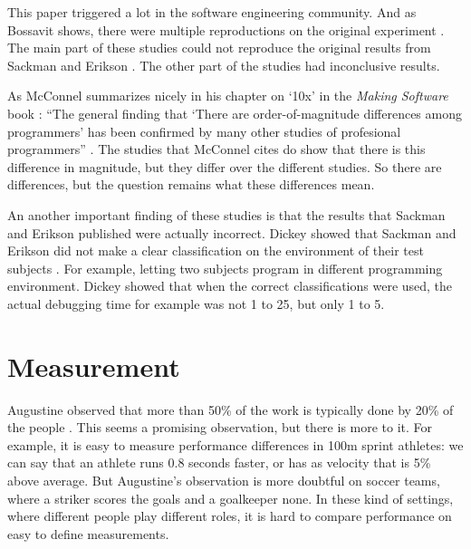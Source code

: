 This paper triggered a lot in the software engineering community.
And as Bossavit shows, there were multiple reproductions on the original experiment \autocite[38,41]{bossavit2013leprechauns}.
The main part of these studies could not reproduce the original results from Sackman and Erikson \autocite[42-44]{bossavit2013leprechauns}.
The other part of the studies had inconclusive results.

As McConnel summarizes nicely in his chapter on `10x' in the \textit{Making Software} book \autocite{MAKING_SOFTWARE}:
``The general finding that `There are order-of-magnitude differences among programmers' has been confirmed by many other studies of profesional programmers'' \autocite[568]{MAKING_SOFTWARE}.
The studies that McConnel cites do show that there is this difference in magnitude, but they differ over the different studies.
So there are differences, but the question remains what these differences mean.

An another important finding of these studies is that the results that Sackman and Erikson published were actually incorrect.
Dickey showed that Sackman and Erikson did not make a clear classification on the environment of their test subjects \autocite[844]{dickey1981programmer}.
For example, letting two subjects program in different programming environment.
Dickey showed that when the correct classifications were used, the actual debugging time for example was not 1 to 25, but only 1 to 5.

\section*{Measurement}

Augustine observed that more than 50\% of the work is typically done by 20\% of the people \autocite{augustine}\autocite[268]{demarco1985programmer}.
This seems a promising observation, but there is more to it.
For example, it is easy to measure performance differences in 100m sprint athletes:
we can say that an athlete runs 0.8 seconds faster, or has as velocity that is 5\% above average.
But Augustine's observation is more doubtful on soccer teams, where a striker scores the goals and a goalkeeper none.
In these kind of settings, where different people play different roles, it is hard to compare performance on easy to define measurements.

